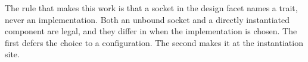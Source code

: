 The rule that makes this work is that a socket in the design facet names a
trait, never an implementation. Both an unbound socket and a directly
instantiated component are legal, and they differ in when the implementation
is chosen. The first defers the choice to a configuration. The second makes
it at the instantiation site.
